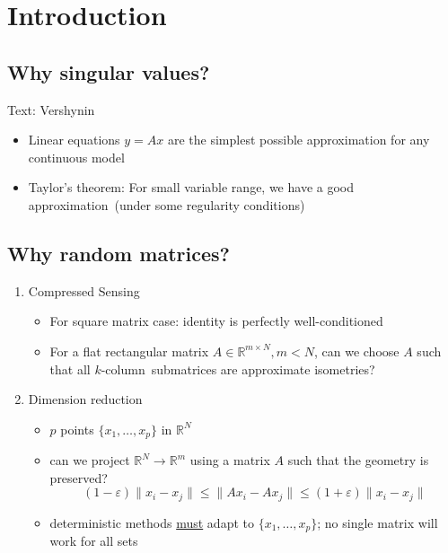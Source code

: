 \documentclass[13pt]{article}
\theoremstyle{plain}
\newcommand{\R}{\mathbb{R}}
\begin{document}
\tableofcontents

\newpage

\section{Introduction}

\subsection{Why singular values?}

Text: Vershynin \cite{non_asym_random_matrices}

\begin{itemize}
    \item Linear equations $y = Ax$ are the simplest possible approximation
        for any continuous model
    \item Taylor's theorem: For small variable range, we have a good
        approximation (under some regularity conditions)
\end{itemize}

\subsection{Why random matrices?}

\begin{enumerate}
    \item Compressed Sensing
        \begin{itemize}
            \item For square matrix case: identity is perfectly well-conditioned
            \item For a flat rectangular matrix $A \in \R^{m \times N}, m < N$, can
                we choose $A$ such that all $k$-column submatrices are approximate isometries?
        \end{itemize}
    \item Dimension reduction
        \begin{itemize}
            \item $p$ points $\{x_1,\ldots,x_p\}$ in $\R^N$
            \item can we project $\R^N \to \R^m$ using a matrix $A$ such that
                the geometry is preserved?
                \[
                    (1-\varepsilon)\|x_i-x_j\| \le \|Ax_i - Ax_j\| \le (1+\varepsilon)\|x_i - x_j\|
                \]
            \item deterministic methods \underline{must} adapt to $\{x_1,\ldots,x_p\}$; no single
                matrix will work for all sets
        \end{itemize}
\end{enumerate}
\end{document}
